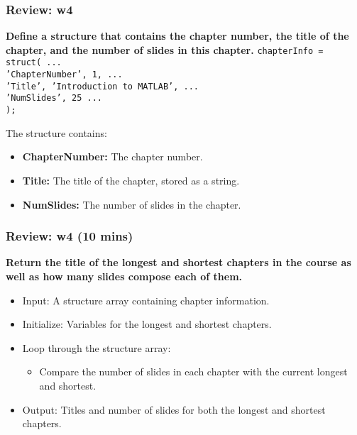 \documentclass[
	11pt, %
]{beamer}
\begin{document}
\begin{frame}
	\frametitle{Review: w4}

	\textbf{Define a structure that contains the chapter number, the title of the chapter, and the number of
slides in this chapter.}
\texttt{chapterInfo = struct( ...} \\
    \texttt{'ChapterNumber', 1, ...} \\
    \texttt{'Title', 'Introduction to MATLAB', ...} \\
    \texttt{'NumSlides', 25 ...} \\
    \texttt{);} \\

    \vspace{0.3cm}

    The structure contains:
    \begin{itemize}
        \item \textbf{ChapterNumber:} The chapter number.
        \item \textbf{Title:} The title of the chapter, stored as a string.
        \item \textbf{NumSlides:} The number of slides in the chapter.
    \end{itemize}
    
\end{frame}


\begin{frame}
	\frametitle{Review: w4 (10 mins)}

	\textbf{Return the title of the longest and shortest chapters in the course as well as how many slides
compose each of them.}

    \begin{itemize}
        \item Input: A structure array containing chapter information.
        \item Initialize: Variables for the longest and shortest chapters.
        \item Loop through the structure array:
        \begin{itemize}
            \item Compare the number of slides in each chapter with the current longest and shortest.
        \end{itemize}
        \item Output: Titles and number of slides for both the longest and shortest chapters.
    \end{itemize}
\end{frame}
\end{document}
